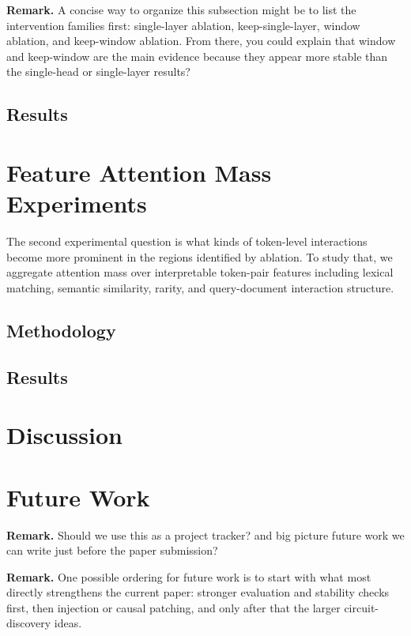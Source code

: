 \documentclass[10pt]{article}
\newcommand{\remark}[1]{{\color{blue}\textbf{Remark.} #1}}
\begin{document}
\remark{A concise way to organize this subsection might be to list the intervention families first: single-layer ablation, keep-single-layer, window ablation, and keep-window ablation. From there, you could explain that window and keep-window are the main evidence because they appear more stable than the single-head or single-layer results?}

\subsection{Results}


\section{Feature Attention Mass Experiments}

The second experimental question is what kinds of token-level interactions become more prominent in the regions identified by ablation.
To study that, we aggregate attention mass over interpretable token-pair features including lexical matching, semantic similarity, rarity, and query-document interaction structure.

\subsection{Methodology}



\subsection{Results}


\section{Discussion}



\section{Future Work}

\remark{Should we use this as a project tracker? and big picture future work we can write just before the paper submission? }

\remark{One possible ordering for future work is to start with what most directly strengthens the current paper: stronger evaluation and stability checks first, then injection or causal patching, and only after that the larger circuit-discovery ideas.}
\end{document}
